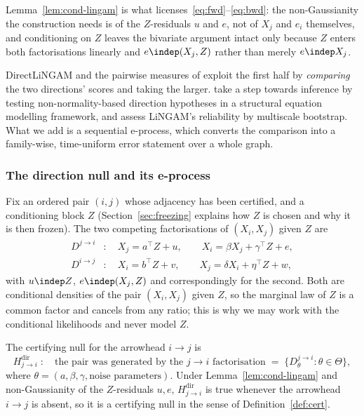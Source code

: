 Lemma~\ref{lem:cond-lingam} is what licenses~\eqref{eq:fwd}--\eqref{eq:bwd}: the
non-Gaussianity the construction needs is of the $Z$-residuals $u$ and $e$, not
of $X_j$ and $e_i$ themselves, and conditioning on $Z$ leaves the bivariate
argument intact only because $Z$ enters both factorisations linearly and
$e \indep (X_j, Z)$ rather than merely $e \indep X_j$.

DirectLiNGAM \citep{shimizu2011directlingam} and the pairwise measures of
\citet{hyvarinen2013pairwise} exploit the first half by \emph{comparing} the
two directions' scores and taking the larger. \citet{shimizu2008use} take a
step towards inference by testing non-normality-based direction hypotheses in
a structural equation modelling framework, and \citet{komatsu2010assessing}
assess LiNGAM's reliability by multiscale bootstrap. What we add is a
sequential e-process, which converts the comparison into a family-wise,
time-uniform error statement over a whole graph.

\subsubsection{The direction null and its e-process}\label{sec:dirnull}

Fix an ordered pair $(i,j)$ whose adjacency has been certified, and a
conditioning block $Z$ (Section~\ref{sec:freezing} explains how $Z$ is chosen
and why it is then frozen). The two competing factorisations of $(X_i, X_j)$
given $Z$ are
\begin{align}
D^{j \to i} &: \quad X_j = a^\top Z + u, \qquad
                     X_i = \beta X_j + \gamma^\top Z + e, \label{eq:fwd}\\
D^{i \to j} &: \quad X_i = b^\top Z + v, \qquad
                     X_j = \delta X_i + \eta^\top Z + w, \label{eq:bwd}
\end{align}
with $u \indep Z$, $e \indep (X_j, Z)$ and correspondingly for the second.
Both are conditional densities of the pair $(X_i, X_j)$ given $Z$, so the
marginal law of $Z$ is a common factor and cancels from any ratio; this is why
we may work with the conditional likelihoods and never model $Z$.

The certifying null for the arrowhead $i \to j$ is
\begin{equation}\label{eq:dirnull}
H^{\mathrm{dir}}_{j \to i} \;:\quad
\text{the pair was generated by the } j \to i \text{ factorisation}
\;=\; \{D^{j\to i}_\theta : \theta \in \Theta\},
\end{equation}
where $\theta = (a, \beta, \gamma, \text{noise parameters})$. Under
Lemma~\ref{lem:cond-lingam} and non-Gaussianity of the $Z$-residuals $u, e$,
$H^{\mathrm{dir}}_{j \to i}$ is true whenever the arrowhead $i \to j$ is
absent, so it is a certifying null in the sense of Definition~\ref{def:cert}.

